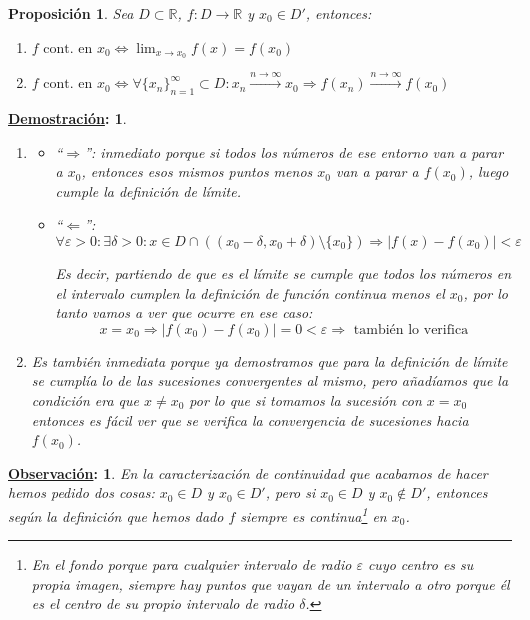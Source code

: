 \documentclass[10pt,a4paper,openright]{book}
\theoremstyle{break}
\newtheorem*{prop}{Proposición}
\newtheorem*{demo}{\underline{Demostración}:}
\newtheorem*{obs}{\underline{Observación}:}
\begin{document}
\begin{prop}
Sea $D\subset \mathbb R$, $f: D\longrightarrow \mathbb R$ y $x_0\in D'$, entonces:
\begin{enumerate}
\item $f\mbox{ cont. en }x_0 \Leftrightarrow \lim_{x\rightarrow x_0} f(x)=f(x_0)$

\item $f\mbox{ cont. en }x_0 \Leftrightarrow \forall \{x_n\}_{n=1}^\infty\subset D: x_n\xrightarrow{n\rightarrow \infty} x_0\Rightarrow f(x_n)\xrightarrow{n\rightarrow \infty} f(x_0)$
\end{enumerate}
\end{prop}
\begin{demo}
\begin{enumerate}
\item 
\begin{itemize}
\item ``$\Rightarrow $'': inmediato porque si todos los números de ese entorno van a parar a $x_0$, entonces esos mismos puntos menos $x_0$ van a parar a $f(x_0)$, luego cumple la definición de límite.

\item ``$\Leftarrow$'':
$$\forall \varepsilon>0 : \exists \delta >0 : x\in D\cap\left( (x_0-\delta, x_0+\delta)\mbox{\textbackslash}\{x_0\}\right)\Rightarrow |f(x)-f(x_0)|<\varepsilon$$

Es decir, partiendo de que es el límite se cumple que todos los números en el intervalo cumplen la definición de función continua menos el $x_0$, por lo tanto vamos a ver que ocurre en ese caso:
$$x=x_0\Rightarrow |f(x_0)-f(x_0)|=0<\varepsilon\Rightarrow \mbox{ también lo verifica}$$
\end{itemize}

\item Es también inmediata porque ya demostramos que para la definición de límite se cumplía lo de las sucesiones convergentes al mismo, pero añadíamos que la condición era que $x\neq x_0$ por lo que si tomamos la sucesión con $x=x_0$ entonces es fácil ver que se verifica la convergencia de sucesiones hacia $f(x_0)$.
\end{enumerate}
\end{demo}

\begin{obs}
En la caracterización de continuidad que acabamos de hacer hemos pedido dos cosas: $x_0\in D$ y $x_0\in D'$, pero si $x_0\in D$ y $x_0\notin D'$, entonces según la definición que hemos dado $f$ siempre es continua\footnote{En el fondo porque para cualquier intervalo de radio $\varepsilon$ cuyo centro es su propia imagen, siempre hay puntos que vayan de un intervalo a otro porque él es el centro de su propio intervalo de radio $\delta$.} en $x_0$.
\end{obs}
\end{document}
